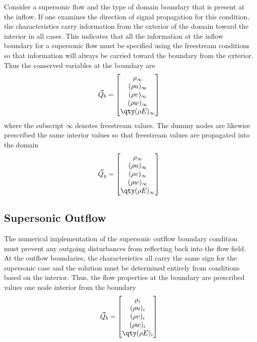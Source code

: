 Consider a supersonic flow and the type of domain boundary that is present at the inflow. If one examines the direction of signal propagation for this condition, the characteristics carry information from the exterior of the domain toward the interior in all cases. This indicates that all the information at the inflow boundary for a supersonic flow must be specified using the freestream conditions so that information will always be carried toward the boundary from the exterior. Thus the conserved variables at the boundary are
%
\begin{equation}
\vec{Q}_b = \begin{bmatrix} \rho_\infty \\
  (\rho u)_\infty \\
  (\rho v)_\infty \\
  (\rho w)_\infty \\
  \qty(\rho E)_\infty \end{bmatrix}
\end{equation}
%
where the subscript $\infty$ denotes freestream values. The dummy nodes are likewise prescribed the same interior values so that freestream values are propagated into the domain
%
\begin{equation}
\vec{Q}_g = \begin{bmatrix} \rho_\infty \\
  (\rho u)_\infty \\
  (\rho v)_\infty \\
  (\rho w)_\infty \\
  \qty(\rho E)_\infty \end{bmatrix}
\end{equation}

\subsection{Supersonic Outflow}

The numerical implementation of the supersonic outflow boundary condition must prevent any outgoing disturbances from reflecting back into the flow field. At the outflow boundaries, the characteristics all carry the same sign for the supersonic case and the solution must be determined entirely from conditions based on the interior. Thus, the flow properties at the boundary are prescribed values one node interior from the boundary
%
\begin{equation}
\vec{Q}_b = \begin{bmatrix} \rho_i \\
  (\rho u)_i \\
  (\rho v)_i \\
  (\rho w)_i \\
  \qty(\rho E)_i \end{bmatrix}
\end{equation}
%

